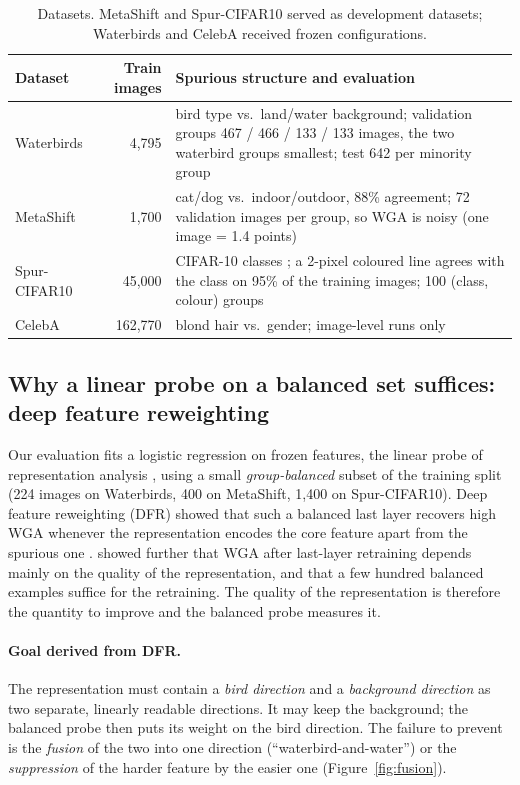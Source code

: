 \documentclass[11pt]{article}
\begin{document}
\begin{table}[H]
\centering
\caption{Datasets. MetaShift and Spur-CIFAR10 served as development datasets; Waterbirds and CelebA
received frozen configurations.}
\small
\begin{tabularx}{\linewidth}{l r X}
\toprule
Dataset & Train images & Spurious structure and evaluation \\
\midrule
Waterbirds \citep{sagawa2020groupdro} & 4,795 & bird type vs.\ land/water background; validation groups 467 / 466 / 133 / 133 images, the two waterbird groups smallest; test 642 per minority group \\
MetaShift \citep{liang2022metashift} & 1,700 & cat/dog vs.\ indoor/outdoor, 88\% agreement; 72 validation images per group, so WGA is noisy (one image = 1.4 points) \\
Spur-CIFAR10 & 45,000 & CIFAR-10 classes \citep{krizhevsky2009cifar}; a 2-pixel coloured line agrees with the class on 95\% of the training images; 100 (class, colour) groups \\
CelebA \citep{liu2015celeba} & 162,770 & blond hair vs.\ gender; image-level runs only \\
\bottomrule
\end{tabularx}
\end{table}

\subsection{Why a linear probe on a balanced set suffices: deep feature reweighting}
Our evaluation fits a logistic regression on frozen features, the linear probe of representation analysis
\citep{alain2017probes}, using a small \emph{group-balanced} subset of
the training split (224 images on Waterbirds, 400 on MetaShift, 1,400 on Spur-CIFAR10). Deep feature
reweighting (DFR) showed that such a balanced last layer recovers high WGA whenever the representation
encodes the core feature apart from the spurious one \citep{kirichenko2023dfr}. \citet{izmailov2022feature}
showed further that WGA after last-layer retraining depends mainly on the quality of the representation,
and \citet{labonte2023lastlayer} that a few hundred balanced examples suffice for the retraining. The
quality of the representation is therefore the quantity to improve and the balanced probe measures it.

\paragraph{Goal derived from DFR.} The representation must contain a \emph{bird direction} and a
\emph{background direction} as two separate, linearly readable directions. It may keep the background; the
balanced probe then puts its weight on the bird direction. The failure to prevent is the \emph{fusion} of the
two into one direction (``waterbird-and-water'') or the \emph{suppression} of the harder feature by the easier
one (Figure~\ref{fig:fusion}).
\end{document}
